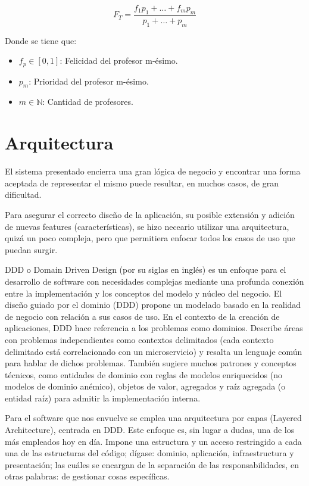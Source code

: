 \begin{equation}
	F_T = \frac{f_1p_1 + \dots + f_mp_m}{p_1 + \dots + p_m}
\end{equation}

\noindent Donde se tiene que:
\begin{itemize}
	\item $f_p \in [0, 1]$: Felicidad del profesor m-ésimo.
	\item $p_m$: Prioridad del profesor m-ésimo.
	\item $m \in \mathbb{N}$: Cantidad de profesores.
\end{itemize}


\section{Arquitectura}

El  sistema presentado encierra una gran lógica de negocio y encontrar una forma aceptada de representar el mismo puede resultar, en muchos casos, de gran dificultad.

Para asegurar el correcto diseño de la aplicación, su posible extensión y adición de nuevas features (características), se hizo neceario utilizar una arquitectura, quizá un poco compleja, pero que permitiera enfocar todos los casos de uso que puedan surgir. 

DDD o Domain Driven Design (por su siglas en inglés) es un enfoque para el desarrollo de software con necesidades complejas mediante una profunda conexión entre la implementación y los conceptos del modelo y núcleo del negocio.\cite{ddd_wiki} El diseño guiado por el dominio (DDD) propone un modelado basado en la realidad de negocio con relación a sus casos de uso. En el contexto de la creación de aplicaciones, DDD hace referencia a los problemas como dominios. Describe áreas con problemas independientes como contextos delimitados (cada contexto delimitado está correlacionado con un microservicio) y resalta un lenguaje común para hablar de dichos problemas. También sugiere muchos patrones y conceptos técnicos, como entidades de dominio con reglas de modelos enriquecidos (no modelos de dominio anémico), objetos de valor, agregados y raíz agregada (o entidad raíz) para admitir la implementación interna.\cite{ddd_dotnet}

Para el software que nos envuelve se emplea una arquitectura por capas (Layered Architecture), centrada en DDD. Este enfoque es, sin lugar a dudas, una de los más empleados hoy en día. Impone una estructura y un acceso restringido a cada una de las estructuras del código; dígase: dominio, aplicación, infraestructura y presentación; las cuáles se encargan de la separación de las responsabilidades, en otras palabras: de gestionar cosas específicas.

